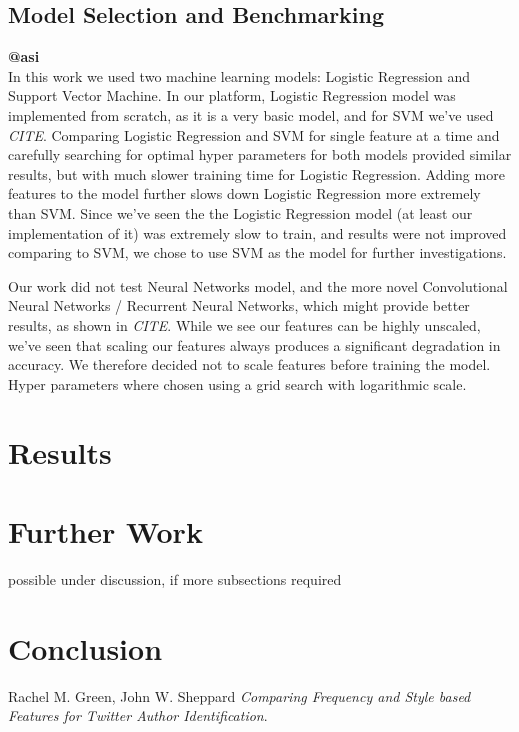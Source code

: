 \documentclass[a4paper]{article}
\begin{document}
\subsection{Model Selection and Benchmarking}
\textbf{@asi}\\
In this work we used two machine learning models: Logistic Regression and Support Vector Machine.
In our platform, Logistic Regression model was implemented from scratch, as it is a very basic model, and for SVM we've used \emph{CITE}.
Comparing Logistic Regression and SVM for single feature at a time and carefully searching for optimal hyper parameters for both models provided similar results, but with much slower training time for Logistic Regression.
Adding more features to the model further slows down Logistic Regression more extremely than SVM.
Since we've seen the the Logistic Regression model (at least our implementation of it) was extremely slow to train, and results were not improved comparing to SVM, we chose to use SVM as the model for further investigations.

Our work did not test Neural Networks model, and the more novel Convolutional Neural Networks / Recurrent Neural Networks, which might provide better results, as shown in \emph{CITE}.
While we see our features can be highly unscaled, we've seen that scaling our features always produces a significant degradation in accuracy.
We therefore decided not to scale features before training the model.
Hyper parameters where chosen using a grid search with logarithmic scale.
\section{Results}
\label{Results}
\section{Further Work}
\label{Further Work}
possible under discussion, if more subsections required
\section{Conclusion}
\label{Conclusion}

\begin{thebibliography}{9}

	Rachel M. Green, John W. Sheppard
	\textit{Comparing Frequency and Style based Features for Twitter Author Identification}.
\end{thebibliography}
\end{document}
